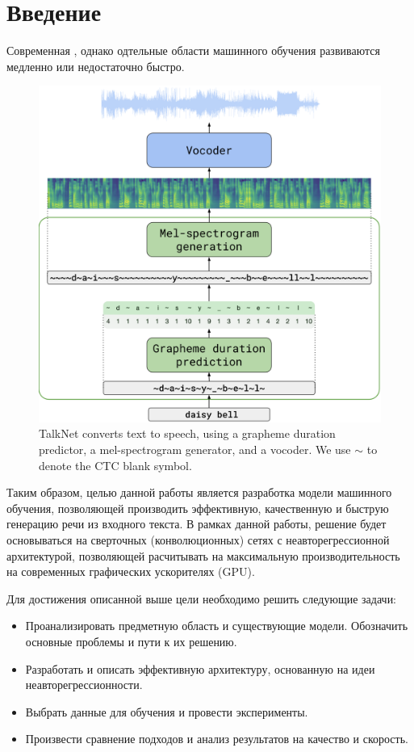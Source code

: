 \section*{Введение}

Современная , однако одтельные области машинного обучения развиваются медленно или недостаточно быстро.

\begin{figure}[!ht]
\centering
\includegraphics[width=1.0\textwidth]{images/arch.png}
\caption{TalkNet converts text to speech, using a grapheme duration predictor, a mel-spectrogram generator, and a vocoder. We use $\sim$ to denote the CTC blank symbol.}
\label{fig:arch}
\end{figure}

Таким образом, целью данной работы является разработка модели машинного обучения, позволяющей производить эффективную, качественную и быструю генерацию речи из входного текста. В рамках данной работы, решение будет основываться на сверточных (конволюционных) сетях с неавторегрессионной архитектурой, позволяющей расчитывать на максимальную производительность на современных графических ускорителях (GPU).

Для достижения описанной выше цели необходимо решить следующие задачи:
\begin{itemize}
    \item Проанализировать предметную область и существующие модели. Обозначить основные проблемы и пути к их решению.
    \item Разработать и описать эффективную архитектуру, основанную на идеи неавторегрессионности.
    \item Выбрать данные для обучения и провести эксперименты.
    \item Произвести сравнение подходов и анализ результатов на качество и скорость.
\end{itemize}

